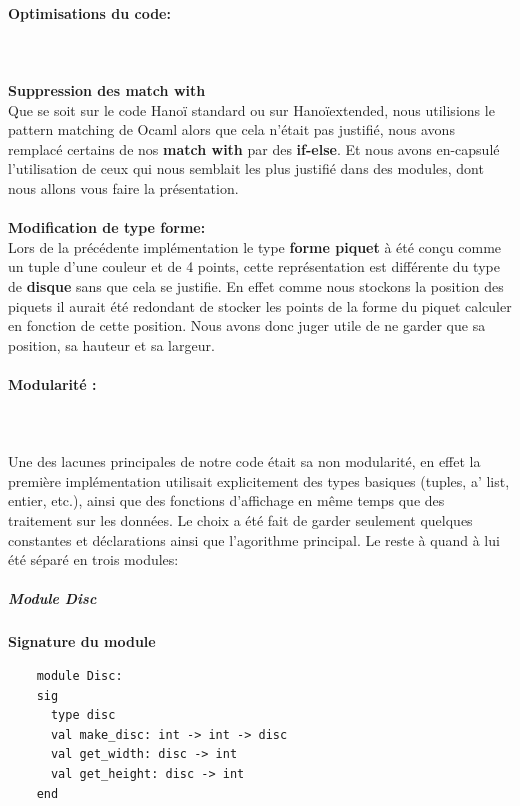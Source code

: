\documentclass[a4paper,11pt]{article}
\begin{document}
\paragraph{Optimisations du code:} \mbox{}\\\\
\textbf{Suppression des match with}\\
Que se soit sur le code Hanoï standard ou sur Hanoïextended, nous utilisions le pattern matching de Ocaml alors que cela n'était pas justifié, nous avons remplacé certains de nos  \textbf{match with} par des \textbf{if-else}.
Et nous avons en-capsulé l'utilisation de ceux qui nous semblait les plus justifié dans des modules, dont nous allons vous faire la présentation.\\\\
\textbf{Modification de type forme:}\\
Lors de la précédente implémentation le type \textbf{forme piquet} à été conçu comme un tuple d'une couleur et de 4 points, cette représentation est différente du type de \textbf{disque} sans que cela se justifie.
En effet comme nous stockons la position des piquets il aurait été redondant de stocker les points de la forme du piquet calculer en fonction de cette position.
Nous avons donc juger utile de ne garder que sa position, sa hauteur et sa largeur.

\paragraph{Modularité :}\mbox{}\\\\
Une des lacunes principales de notre code était sa non modularité, en effet la première implémentation utilisait explicitement des types basiques (tuples, a' list, entier, etc.), ainsi que des fonctions d'affichage en même temps que des traitement sur les données.
Le choix a été fait de garder seulement quelques constantes et déclarations ainsi que l'agorithme principal.
Le reste à quand à lui été séparé en trois modules:

\subparagraph{Module Disc}
\begin{center}
	\textbf{Signature du module}
	\begin{lstlisting}
	module Disc:
	sig
	  type disc
	  val make_disc: int -> int -> disc
	  val get_width: disc -> int
	  val get_height: disc -> int
	end
	\end{lstlisting}
\end{center}
\end{document}
